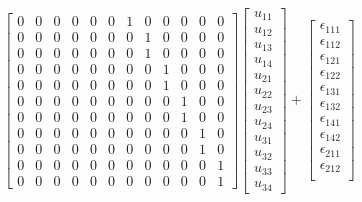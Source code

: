 \documentclass[paper=a4, fontsize=11pt]{scrartcl} %
\begin{document}
$$\begin{bmatrix}
                             0 & 0 & 0 & 0 & 0 & 0 & 1 & 0 & 0 & 0 & 0 & 0\\
                             0 & 0 & 0 & 0 & 0 & 0 & 0 & 1 & 0 & 0 & 0 & 0\\
                             0 & 0 & 0 & 0 & 0 & 0 & 0 & 1 & 0 & 0 & 0 & 0\\
                             0 & 0 & 0 & 0 & 0 & 0 & 0 & 0 & 1 & 0 & 0 & 0\\
                             0 & 0 & 0 & 0 & 0 & 0 & 0 & 0 & 1 & 0 & 0 & 0\\
                             0 & 0 & 0 & 0 & 0 & 0 & 0 & 0 & 0 & 1 & 0 & 0\\
                             0 & 0 & 0 & 0 & 0 & 0 & 0 & 0 & 0 & 1 & 0 & 0\\
                             0 & 0 & 0 & 0 & 0 & 0 & 0 & 0 & 0 & 0 & 1 & 0\\
                             0 & 0 & 0 & 0 & 0 & 0 & 0 & 0 & 0 & 0 & 1 & 0\\
                             0 & 0 & 0 & 0 & 0 & 0 & 0 & 0 & 0 & 0 & 0 & 1\\
                             0 & 0 & 0 & 0 & 0 & 0 & 0 & 0 & 0 & 0 & 0 & 1
\end{bmatrix}
\begin{bmatrix} 
u_{11}  \\ u_{12} \\ u_{13}  \\ u_{14}  \\ u_{21}  \\ u_{22}  \\ u_{23} \\ u_{24} \\ u_{31}  \\ u_{32}  \\ u_{33} \\ u_{34} 
\end{bmatrix}
+ 
\begin{bmatrix} 
\epsilon_{1 1 1} \\ \epsilon_{1 1 2}\\ 
\epsilon_{1 2 1} \\ \epsilon_{1 2 2} \\ 
\epsilon_{1 3 1} \\ \epsilon_{1 3 2} \\ 
\epsilon_{1 4 1} \\ \epsilon_{1 4 2} \\ 
\epsilon_{2 1 1} \\\epsilon_{2 1 2} \\ 

\end{bmatrix}$$
\end{document}

